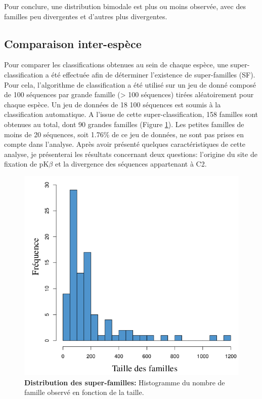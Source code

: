 \documentclass[12pt,a4paper]{article}
\begin{document}
	Pour conclure, une distribution bimodale est plus ou moins observée, avec des familles peu divergentes et d'autres plus divergentes.
	\subsection{Comparaison inter-espèce}
	Pour comparer les classifications obtenues au sein de chaque espèce, une super-classification a été effectuée afin de déterminer l'existence de super-familles (SF). Pour cela, l'algorithme de classification a été utilisé sur un jeu de donné composé de 100 séquences par grande famille (> 100 séquences) tirées aléatoirement pour chaque espèce. Un jeu de données de 18 100 séquences est soumis à la classification automatique. A l'issue de cette super-classification, 158 familles sont obtenues au total, dont 90 grandes familles (Figure \ref{distribution_SF}). Les petites familles de moins de 20 séquences, soit 1.76\% de ce jeu de données, ne sont pas prises en compte dans l'analyse. Après avoir présenté quelques caractéristiques de cette analyse, je présenterai les résultats concernant deux questions: l'origine du site de fixation de pK$\beta$ et la divergence des séquences appartenant à C2.
	
	\begin{figure}	
	\center
	\includegraphics[scale=0.3]{img/distribution_SF.png}
	\caption{\textbf{Distribution des super-familles:} Histogramme du nombre de famille observé en fonction de la taille. 
	\label{distribution_SF}
		} 
	\end{figure}
	
\end{document}
